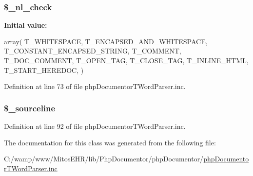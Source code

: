 \hypertarget{classphp_documentor_t_word_parser_a38f318fc1ca497294e02a846973dedb4}{
\subsubsection[{\$\-\_\-nl\-\_\-check}]{\setlength{\rightskip}{0pt plus 5cm}\$\-\_\-nl\-\_\-check}}\label{classphp_documentor_t_word_parser_a38f318fc1ca497294e02a846973dedb4}
{\bfseries \-Initial value\-:}
\begin{DoxyCode}
 array(
        T_WHITESPACE,
        T_ENCAPSED_AND_WHITESPACE,
        T_CONSTANT_ENCAPSED_STRING,
        T_COMMENT,
        T_DOC_COMMENT,
        T_OPEN_TAG,
        T_CLOSE_TAG,
        T_INLINE_HTML,
        T_START_HEREDOC,
    )
\end{DoxyCode}


\-Definition at line 73 of file php\-Documentor\-T\-Word\-Parser.\-inc.

\hypertarget{classphp_documentor_t_word_parser_a36f50208ab69932b4ec10261eaf93c29}{
\subsubsection[{\$\-\_\-sourceline}]{\setlength{\rightskip}{0pt plus 5cm}\$\-\_\-sourceline}}\label{classphp_documentor_t_word_parser_a36f50208ab69932b4ec10261eaf93c29}


\-Definition at line 92 of file php\-Documentor\-T\-Word\-Parser.\-inc.



\-The documentation for this class was generated from the following file\-:\begin{DoxyCompactItemize}
\item 
\-C\-:/wamp/www/\-Mitos\-E\-H\-R/lib/\-Php\-Documentor/php\-Documentor/\hyperlink{php_documentor_t_word_parser_8inc}{php\-Documentor\-T\-Word\-Parser.\-inc}\end{DoxyCompactItemize}
